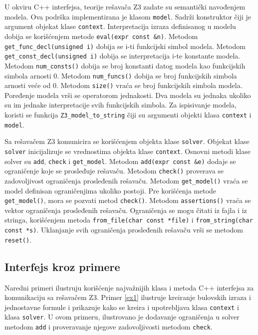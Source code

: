 \documentclass[12pt,oneside]{memoir}
\begin{document}
U okviru C++ interfejsa, teorije rešavača Z3 zadate su semantički navođenjem modela. Ova podrška implementirana je klasom \texttt{model}. Sadrži konstruktor čiji je argument objekat klase \texttt{context}. Interpretacija izraza definisanog u modelu dobija se korišćenjem metode \texttt{eval(expr const \&n)}. Metodom \texttt{get\_func\_decl(unsigned i)} dobija se i-ti funkcijski simbol modela.  
Metodom \texttt{get\_const\_decl(unsigned i)} dobija se interpretacija i-te konstante modela. Metodom \texttt{num\_consts()} dobija se broj konstanti datog modela kao funkcijskih simbola arnosti 0. Metodom \texttt{num\_funcs()} dobija se broj funkcijskih simbola arnosti veće od 0.  Metodom \texttt{size()} vraća se broj funkcijskih simbola modela. Poređenje modela vrši se operatorom jednakosti. Dva modela su jednaka ukoliko su im jednake interpretacije svih funkcijskih simbola. Za ispisivanje modela, koristi se funkcija \texttt{Z3\_model\_to\_string} čiji su argumenti objekti klasa \texttt{context} i \texttt{model}.\par 


Sa rešavačem Z3 komunicira se korišćenjem objekta klase \texttt{solver}. Objekat klase \texttt{solver} inicijalizuje se vrednostima objekta klase \texttt{context}. Osnovni metodi klase solver su \texttt{add}, \texttt{check} i \texttt{get\_model}. Metodom \texttt{add(expr const \&e)} dodaje se ograničenje koje se prosleđuje rešavaču. Metodom \texttt{check()} proverava se zadovoljivost ograničenja prosleđenih rešavaču. Metodom \texttt{get\_model()} vraća se model definisan ograničenjima ukoliko postoji. Pre korišćenja metode \texttt{get\_model()}, mora se pozvati metod \texttt{check()}. Metodom \texttt{assertions()} vraća se vektor ograničenja prosleđenih rešavaču. Ograničenja se mogu čitati iz fajla i iz stringa, korišćenjem metoda \texttt{from\_file(char const *file)} i \texttt{from\_string(char const *s)}. Uklanjanje svih ograničenja prosleđenih rešavaču vrši se metodom \texttt{reset()}. \par

\subsection{Interfejs kroz primere}
Naredni primeri ilustruju korišćenje najvažnijih klasa i metoda C++ interfejsa za komunikaciju sa rešavačem Z3. Primer \ref{ex1} ilustruje kreiranje bulovskih izraza i jednostavne formule i prikazuje kako se kreira i upotrebljava klasa \texttt{context} i klasa \texttt{solver}. U ovom primeru, ilustrovano je dodavanje ograničenja u solver metodom \texttt{add} i proveravanje njegove zadovoljivosti metodom \texttt{check}. 
\end{document}
